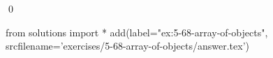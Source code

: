 
\begin{ex}
  \label{ex:5-68-array-of-objects}
  
  \qed
\end{ex}
\begin{python0}
from solutions import *
add(label="ex:5-68-array-of-objects",
    srcfilename='exercises/5-68-array-of-objects/answer.tex')
\end{python0}
